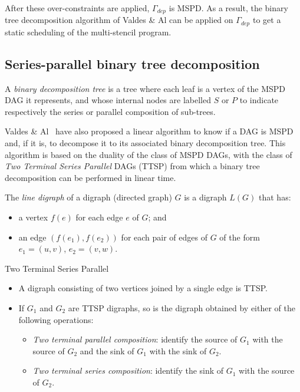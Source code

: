 After these over-constraints are applied, $\Gamma_{dep}$ is MSPD. As a result, the binary tree decomposition algorithm of Valdes \& Al can be applied on $\Gamma_{dep}$ to get a static scheduling of the multi-stencil program.

\subsection{Series-parallel binary tree decomposition}
A \emph{binary decomposition tree} is a tree where each leaf is a vertex of the MSPD DAG it represents, and whose internal nodes are labelled $S$ or $P$ to indicate respectively the series or parallel composition of sub-trees.

Valdes \& Al~\cite{Valdes:1979:RSP:800135.804393} have also proposed a linear algorithm to know if a DAG is MSPD and, if it is, to decompose it to its associated binary decomposition tree. This algorithm is based on the duality of the class of MSPD DAGs, with the class of \emph{Two Terminal Series Parallel} DAGs (TTSP) from which a binary tree decomposition can be performed in linear time. 

\begin{mydef}
The \emph{line digraph} of a digraph (directed graph) $G$ is a digraph $L(G)$ that has:
\begin{itemize}
\item a vertex $f(e)$ for each edge $e$ of $G$; and
\item an edge $(f(e_1),f(e_2))$ for each pair of edges of $G$ of the form $e_1=(u,v)$, $e_2=(v,w)$.
\end{itemize}
\end{mydef}

\begin{mydef}Two Terminal Series Parallel
\begin{itemize}
\item A digraph consisting of two vertices joined by a single edge is TTSP.
\item If $G_1$ and $G_2$ are TTSP digraphs, so is the digraph obtained by either of the following operations:
\begin{itemize}
\item \emph{Two terminal parallel composition}: identify the source of $G_1$ with the source of $G_2$ and the sink of $G_1$ with the sink of $G_2$.
\item \emph{Two terminal series composition}: identify the sink of $G_1$ with the source of $G_2$.
\end{itemize}
\end{itemize}
\end{mydef}

